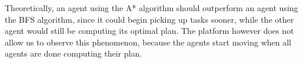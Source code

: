 \documentclass[10pt]{article}
\begin{document}
\noindent
Theoretically, an agent using the A* algorithm should outperform an agent using the BFS algorithm, since it could begin picking up tasks sooner, while the other agent would still be computing its optimal plan.
The platform however does not allow us to observe this phenomenon, because the agents start moving when all agents are done computing their plan.
\end{document}
